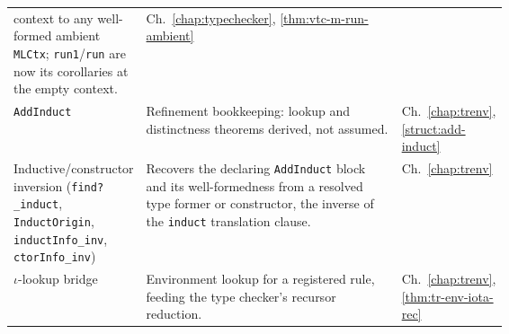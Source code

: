 \begin{tabular}{lp{0.64\linewidth}l}
context to any well-formed ambient \texttt{MLCtx}; \texttt{run1}/\texttt{run} are now its
corollaries at the empty context. & Ch.~\ref{chap:typechecker}, \ref{thm:vtc-m-run-ambient} \\
\texttt{AddInduct} & Refinement bookkeeping: lookup and distinctness theorems derived, not
assumed. & Ch.~\ref{chap:trenv}, \ref{struct:add-induct} \\
Inductive/constructor inversion (\texttt{find?\_induct}, \texttt{InductOrigin},
\texttt{inductInfo\_inv}, \texttt{ctorInfo\_inv}) & Recovers the declaring \texttt{AddInduct}
block and its well-formedness from a resolved type former or constructor, the inverse of the
\texttt{induct} translation clause. & Ch.~\ref{chap:trenv} \\
$\iota$-lookup bridge & Environment lookup for a registered rule, feeding the type checker's
recursor reduction. & Ch.~\ref{chap:trenv}, \ref{thm:tr-env-iota-rec} \\
\bottomrule
\end{tabular}\par\smallskip

